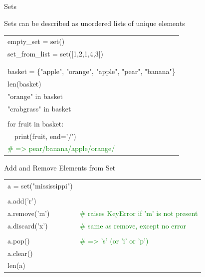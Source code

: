 \documentclass[serif, aspectratio=169]{beamer}
\newcommand{\tgreen}[1]{\textcolor{green}{#1}}
\newenvironment{CLI} %
    {
    \noindent
    \ttfamily 
    \footnotesize
    \begin{tcolorbox}[colback=gray!150,colframe=black]
    \color{white}
    \begin{tabular}{p{4.5cm}p{7.5cm}}
    }
    { 
    \end{tabular}
    \end{tcolorbox}
    }
\begin{document}
\begin{frame}{Sets}
    \begin{block}{Sets can be described as unordered lists of unique elements}
        \vspace{2pt}
        \begin{CLI}
            empty\_set = set() & \\
            \multicolumn{2}{l}{set\_from\_list = set([1,2,1,4,3])} \\
            \\%
            & \\
            \multicolumn{2}{l}{basket = \{"apple", "orange", "apple", "pear", "banana"\}} \\
            len(basket) & \\%
            "orange" in basket & \\%
            "crabgrass" in basket & \\%
            & \\
            for fruit in basket: & \\
            ~~print(fruit, end='/') & \\
            \multicolumn{2}{l}{\tgreen{\# => pear/banana/apple/orange/}} \\
        \end{CLI}
    \end{block}
\end{frame}

\begin{frame}{Add and Remove Elements from Set}
    \begin{CLI}
        a = set("mississippi") & \\%
        & \\
        a.add('r') & \\
        a.remove('m') & \tgreen{\# raises KeyError if 'm' is not present} \\
        a.discard('x')& \tgreen{\# same as remove, except no error} \\
        & \\
        a.pop() & \tgreen{\# => 's' (or 'i' or 'p')} \\
        a.clear() & \\
        len(a) & \\%
    \end{CLI}
\end{frame}
\end{document}
